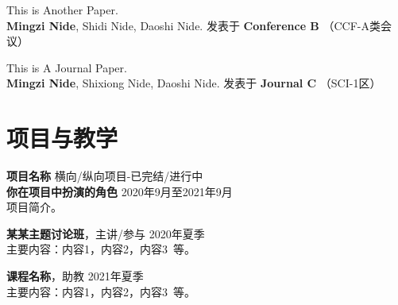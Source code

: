 \documentclass[11pt]{article}
\begin{document}
    \vspace{0.5em}
    This is Another Paper. \\
    \textbf{Mingzi Nide}, Shidi Nide, Daoshi Nide. \hfill 
    发表于 \textbf{Conference B} （CCF-A类会议）

    \vspace{0.5em}
    This is A Journal Paper.\\
    \textbf{Mingzi Nide}, Shixiong Nide, Daoshi Nide. \hfill 
    发表于 \textbf{Journal C} （SCI-1区）

    \section{\makebox[\widthof{\faChalkboardTeacher}][c]{\color{primary_color}{\faChalkboardTeacher}}\quad 项目与教学}
    {\large{\textbf{项目名称}}} \hfill {横向/纵向项目-已完结/进行中}\\
    \textbf{你在项目中扮演的角色} \hfill 2020年9月至2021年9月\\
    项目简介。

    \vspace{0.5em}
    {\large{\textbf{某某主题讨论班}}}，主讲/参与 \hfill {2020年夏季}\\
    主要内容：内容1，内容2，内容3\ 等。
    
    \vspace{0.5em}
    {\large{\textbf{课程名称}}}，助教 \hfill {2021年夏季}\\
    主要内容：内容1，内容2，内容3\ 等。
    
\end{document}
